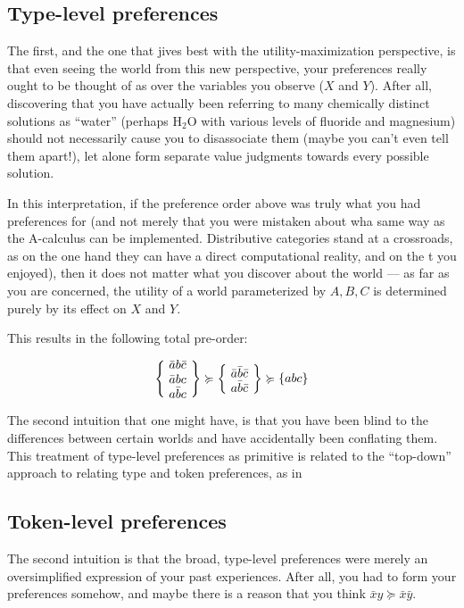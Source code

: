 \documentclass{book}
\newcommand\geqc{\succcurlyeq}
\begin{document}
	\subsection*{Type-level preferences}
	The first, and the one that jives best with the utility-maximization perspective, is that even seeing the world from this new perspective, your preferences really ought to be thought of as over the variables you observe ($X$ and $Y$). After all, discovering that you have actually been referring to many chemically distinct solutions as ``water'' (perhaps H$_2$O with various levels of fluoride and magnesium) should not necessarily cause you to disassociate them (maybe you can't even tell them apart!), let alone form separate value judgments towards every possible solution.
	
	In this interpretation, if the preference order above was truly what you had preferences for (and not merely that you were mistaken about wha same way as the A-calculus can be implemented.
	Distributive categories stand at a crossroads, as on the one hand they can have a direct
	computational reality, and on the t you enjoyed), then it does not matter what you discover about the world --- as far as you are concerned, the utility of a world parameterized by $A,B,C$ is determined purely by its effect on $X$ and $Y$. 
	
	This results in the following total pre-order:
	
	\[ \left\{~\parbox[c]{0.5cm}{$\bar a b \bar c$\\$\bar a b c$ \\ $a \bar b c$}~\right\} \geqc \left\{~\parbox[c]{0.5cm}{$\bar a \bar b \bar c$ \\ $a \bar b \bar c$}~\right\} \geqc \left\{abc \right\} \]
	
	The second intuition that one might have, is that you have been blind to the differences between certain worlds and have accidentally been conflating them. This treatment of type-level preferences as primitive is related to the ``top-down'' approach to relating type and token preferences, as in \cite[chapter 4, pg 55]{girard2008modal}
	
	\subsection*{Token-level preferences}
	
	The second intuition is that the broad, type-level preferences were merely an oversimplified expression of your past experiences. After all, you had to form your preferences somehow, and maybe there is a reason that you think  $\bar x y \geqc \bar x \bar y$.
	
\end{document}
